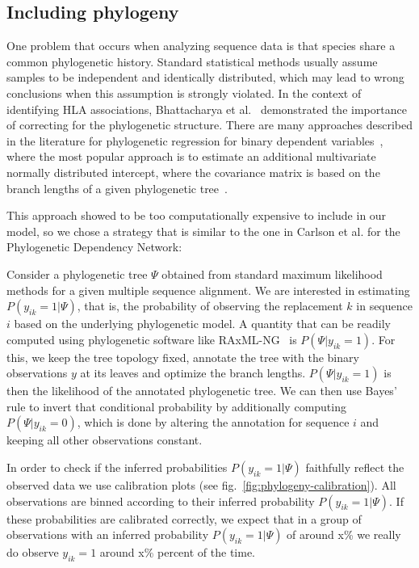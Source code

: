\documentclass[fleqn,11pt]{SelfArx} %
\begin{document}
\subsection*{Including phylogeny}

One problem that occurs when analyzing sequence data is that species share a common phylogenetic history. Standard statistical methods usually assume samples to be independent and identically distributed, which may lead to wrong conclusions when this assumption is strongly violated.
In the context of identifying HLA associations, Bhattacharya et al.~\cite{Bhattacharya2007} demonstrated the importance of correcting for the phylogenetic structure.
There are many approaches described in the literature for phylogenetic regression for binary dependent variables~\cite{Ives2014}, where the most popular approach is to estimate an additional multivariate normally distributed intercept, where the covariance matrix is based on the branch lengths of a given phylogenetic tree~\cite{Ives2009}.

This approach showed to be too computationally expensive to include in our model, so we chose a strategy that is similar to the one in Carlson et al. \cite{Carlson2008} for the Phylogenetic Dependency Network:

Consider a phylogenetic tree \(\Psi\) obtained from standard maximum likelihood methods for a given multiple sequence alignment. We are interested in estimating \(P(y_{ik}=1|\Psi)\), that is, the probability of observing the replacement \(k\) in sequence \(i\) based on the underlying phylogenetic model.
A quantity that can be readily computed using phylogenetic software like RAxML-NG~\cite{Kozlov2019} is \(P(\Psi|y_{ik}=1)\). For this, we keep the tree topology fixed, annotate the tree with the binary observations \(y\) at its leaves and optimize the branch lengths. \(P(\Psi|y_{ik}=1)\) is then the likelihood of the annotated phylogenetic tree. We can then use Bayes' rule to invert that conditional probability by additionally computing \(P(\Psi|y_{ik}=0)\), which is done by altering the annotation for sequence \(i\) and keeping all other observations constant.

In order to check if the inferred probabilities \(P(y_{ik}=1|\Psi)\) faithfully reflect the observed data we use calibration plots (see fig.~\ref{fig:phylogeny-calibration}). All observations are binned according to their inferred probability \(P(y_{ik}=1|\Psi)\). If these probabilities are calibrated correctly, we expect that in a group of observations with an inferred probability \(P(y_{ik}=1|\Psi)\) of around x\% we really do observe \(y_{ik}=1\) around x\% percent of the time.
\end{document}
